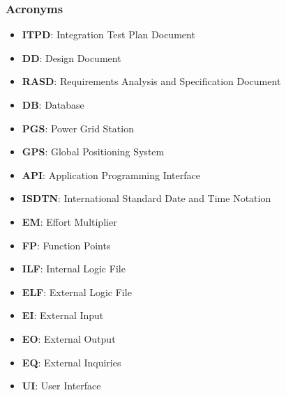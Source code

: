 \documentclass[english]{article}
\begin{document}

\subsubsection{Acronyms}
\begin{itemize}
\item \textbf{ITPD}: Integration Test Plan Document
\item{\textbf{DD}: Design Document}
\item{\textbf{RASD}: Requirements Analysis and Specification Document}
\item{\textbf{DB}: Database}
\item{\textbf{PGS}: Power Grid Station}
\item{\textbf{GPS}: Global Positioning System}
\item{\textbf{API}: Application Programming Interface}
\item{\textbf{ISDTN}: International Standard Date and Time Notation}
\item \textbf{EM}: Effort Multiplier
\item {\textbf{FP}: Function Points}
\item \textbf{ILF}: Internal Logic File
\item \textbf{ELF}: External Logic File
\item \textbf{EI}: External Input
\item \textbf{EO}: External Output
\item \textbf{EQ}: External Inquiries
\item \textbf{UI}: User Interface
\end{itemize}
\end{document}
